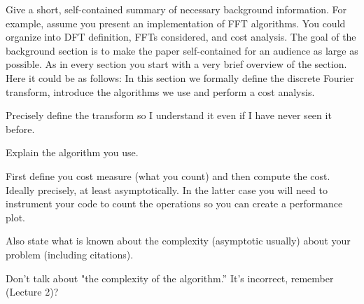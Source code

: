 Give a short, self-contained summary of necessary
background information. For example, assume you present an
implementation of FFT algorithms. You could organize into DFT
definition, FFTs considered, and cost analysis. The goal of the
background section is to make the paper self-contained for an audience
as large as possible. As in every section
you start with a very brief overview of the section. Here it could be as follows: In this section 
we formally define the discrete Fourier transform, introduce the algorithms we use
and perform a cost analysis.

Precisely define the transform so I understand it even if I have never
seen it before.

Explain the algorithm you use.

First define you cost measure (what you count) and then compute the
cost. Ideally precisely, at least asymptotically. In the latter case you will need to instrument your code to count
the operations so you can create a performance plot.

Also state what is
known about the complexity (asymptotic usually) 
about your problem (including citations).

Don't talk about "the complexity of the algorithm.'' It's incorrect,
remember (Lecture 2)?
